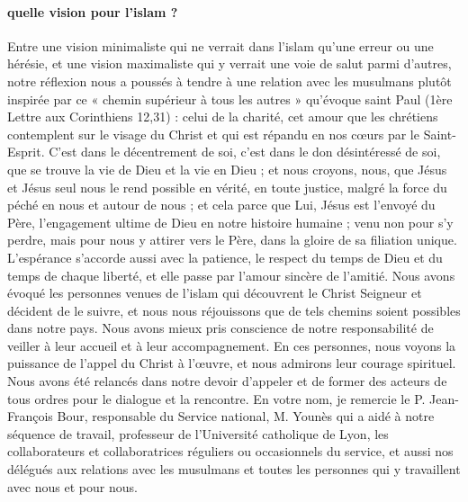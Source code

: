 \paragraph{quelle vision pour l'islam ? } Entre une vision minimaliste qui ne verrait dans l’islam qu’une erreur ou une hérésie, et une vision maximaliste qui y verrait une voie de salut parmi d’autres, notre réflexion nous a poussés à tendre à une relation avec les musulmans plutôt inspirée par ce « chemin supérieur à tous les autres » qu’évoque saint Paul (1ère Lettre aux Corinthiens 12,31) : celui de la charité, cet amour que les chrétiens contemplent sur le visage du Christ et qui est répandu en nos cœurs par le Saint-Esprit. C’est dans le décentrement de soi, c’est dans le don désintéressé de soi, que se trouve la vie de Dieu et la vie en Dieu ; et nous croyons, nous, que Jésus et Jésus seul nous le rend possible en vérité, en toute justice, malgré la force du péché en nous et autour de nous ; et cela parce que Lui, Jésus est l’envoyé du Père, l’engagement ultime de Dieu en notre histoire humaine ; venu non pour s’y perdre, mais pour nous y attirer vers le Père, dans la gloire de sa filiation unique.
L’espérance s’accorde aussi avec la patience, le respect du temps de Dieu et du temps de chaque liberté, et elle passe par l’amour sincère de l’amitié. Nous avons évoqué les personnes venues de l’islam qui découvrent le Christ Seigneur et décident de le suivre, et nous nous réjouissons que de tels chemins soient possibles dans notre pays. Nous avons mieux pris conscience de notre responsabilité de veiller à leur accueil et à leur accompagnement. En ces personnes, nous voyons la puissance de l’appel du Christ à l’œuvre, et nous admirons leur courage spirituel. Nous avons été relancés dans notre devoir d’appeler et de former des acteurs de tous ordres pour le dialogue et la rencontre. En votre nom, je remercie le P. Jean-François Bour, responsable du Service national, M. Younès qui a aidé à notre séquence de travail, professeur de l’Université catholique de Lyon, les collaborateurs et collaboratrices réguliers ou occasionnels du service, et aussi nos délégués aux relations avec les musulmans et toutes les personnes qui y travaillent avec nous et pour nous.

